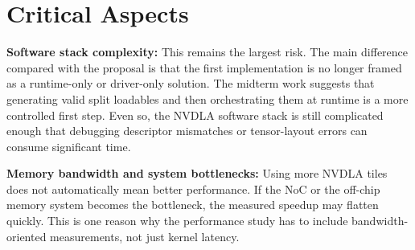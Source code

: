 \documentclass[10pt,sigconf,nonacm]{acmart}
\begin{document}
\section{Critical Aspects}
\textbf{Software stack complexity:} This remains the largest risk. The main difference compared with the proposal is that the first implementation is no longer framed as a runtime-only or driver-only solution. The midterm work suggests that generating valid split loadables and then orchestrating them at runtime is a more controlled first step. Even so, the NVDLA software stack is still complicated enough that debugging descriptor mismatches or tensor-layout errors can consume significant time.


\textbf{Memory bandwidth and system bottlenecks:} Using more NVDLA tiles does not automatically mean better performance. If the NoC or the off-chip memory system becomes the bottleneck, the measured speedup may flatten quickly. This is one reason why the performance study has to include bandwidth-oriented measurements, not just kernel latency.
\end{document}
